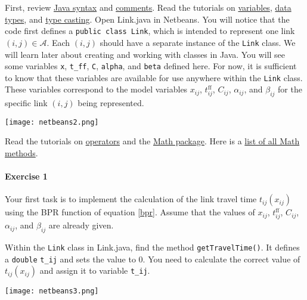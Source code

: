 \documentclass[11pt]{article}
\newcommand{\A}{\mathcal{A}}
\newcommand{\tff}{t^{\mathrm{ff}}_{ij}}
\begin{document}
First, review \href{https://www.w3schools.com/java/java_syntax.asp}{Java syntax} and \href{https://www.w3schools.com/java/java_comments.asp}{comments}.
Read the tutorials on \href{https://www.w3schools.com/java/java_variables.asp}{variables}, \href{https://www.w3schools.com/java/java_data_types.asp}{data types}, and \href{https://www.w3schools.com/java/java_math.asp}{type casting}. 
Open Link.java in Netbeans. You will notice that the code first defines a \texttt{public class Link}, which is intended to represent one link $(i,j)\in\A$. Each $(i,j)$ should have a separate instance of the \texttt{Link} class. 
We will learn later about creating and working with classes in Java. You will see some variables \texttt{x}, \texttt{t\_ff}, \texttt{C}, \texttt{alpha}, and \texttt{beta} defined here. For now, it is sufficient to know that these variables are available for use anywhere within the \texttt{Link} class. These variables correspond to the model variables $x_{ij}$, $t^{\mathrm{ff}}_{ij}$, $C_{ij}$, $\alpha_{ij}$, and $\beta_{ij}$ for the specific link $(i,j)$ being represented. 

\begin{center}
\texttt{[image: netbeans2.png]}
\end{center}


\noindent Read the  tutorials on \href{https://www.w3schools.com/java/java_operators.asp}{operators} and the \href{https://www.w3schools.com/java/java_math.asp}{Math package}. Here is a \href{https://www.w3schools.com/java/java_ref_math.asp}{list of all Math methods}.
	
	
\paragraph*{Exercise 1} Your first task is to implement the calculation of the link travel time $t_{ij}(x_{ij})$ using the BPR function of equation \eqref{bpr}. Assume that the values of $x_{ij}$, $\tff$, $C_{ij}$, $\alpha_{ij}$, and $\beta_{ij}$ are already given. 

Within the \texttt{Link} class in Link.java, find the method \texttt{getTravelTime()}. It defines a \texttt{double} \texttt{t\_{ij}} and sets the value to 0. You need to calculate the correct value of $t_{ij}(x_{ij})$ and assign it to variable \texttt{t\_ij}. 
	
	\begin{center}
		\texttt{[image: netbeans3.png]}
	\end{center}
\end{document}

